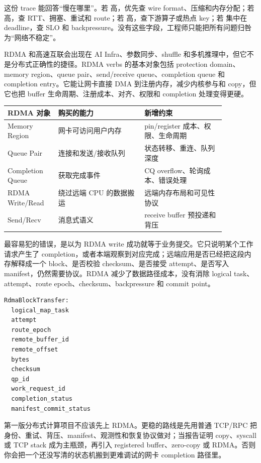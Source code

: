 这份 trace 能回答“慢在哪里”。若  高，优先查 wire format、压缩和内存分配；若  高，查 RTT、拥塞、重试和 route；若  高，查下游算子或热点 key；若  集中在 deadline，查 SLO 和 backpressure。没有这些字段，工程师只能把所有问题归咎为“网络不稳定”。

RDMA 和高速互联会出现在 AI Infra、参数同步、shuffle 和多机推理中，但它不是分布式正确性的捷径。RDMA verbs 的基本对象包括 protection domain、memory region、queue pair、send/receive queue、completion queue 和 completion entry。它能让网卡直接 DMA 到注册内存，减少内核参与和 copy，但它也把 buffer 生命周期、注册成本、对齐、权限和 completion 处理变得更硬。

\begin{center}
\small
\begin{tabular}{p{0.20\linewidth}p{0.34\linewidth}p{0.32\linewidth}}
\toprule
RDMA 对象 & 购买的能力 & 新增约束 \\
\midrule
Memory Region & 网卡可访问用户内存 & pin/register 成本、权限、生命周期 \\
Queue Pair & 连接和发送/接收队列 & 状态转移、重连、队列深度 \\
Completion Queue & 获取完成事件 & CQ overflow、轮询成本、错误处理 \\
RDMA Write/Read & 绕过远端 CPU 的数据搬运 & 远端内存布局和可见性协议 \\
Send/Recv & 消息式语义 & receive buffer 预投递和背压 \\
\bottomrule
\end{tabular}
\end{center}

最容易犯的错误，是以为 RDMA write 成功就等于业务提交。它只说明某个工作请求产生了 completion，或者本端观察到对应完成；远端应用是否已经把这段内存解释成一个 block、是否校验 checksum、是否接受 attempt、是否写入 manifest，仍然需要协议。RDMA 减少了数据路径成本，没有消除 logical task、attempt、route epoch、checksum、backpressure 和 commit point。

\begin{lstlisting}[numbers=none,caption={RDMA shuffle 仍然需要的业务状态}]
RdmaBlockTransfer:
  logical_map_task
  attempt
  route_epoch
  remote_buffer_id
  remote_offset
  bytes
  checksum
  qp_id
  work_request_id
  completion_status
  manifest_commit_status
\end{lstlisting}

第一版分布式计算项目不应该先上 RDMA。更稳的路线是先用普通 TCP/RPC 把身份、重试、背压、manifest、观测性和恢复协议做对；当报告证明 copy、syscall 或 TCP stack 成为主瓶颈，再引入 registered buffer、zero-copy 或 RDMA。否则你会把一个还没写清的状态机搬到更难调试的网卡 completion 路径里。

